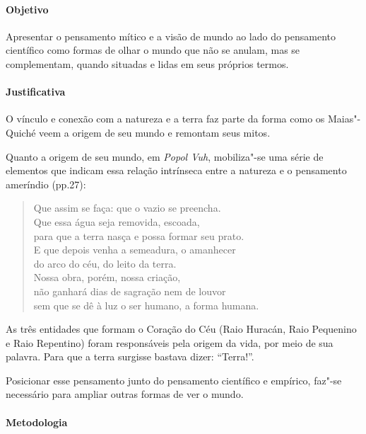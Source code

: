 \documentclass[11pt]{extarticle}
\begin{document}
\paragraph{Objetivo} Apresentar o pensamento mítico e a visão de mundo ao lado do pensamento científico
como formas de olhar o mundo que não se anulam, mas se complementam, quando situadas e 
lidas em seus próprios termos. 

\paragraph{Justificativa} O vínculo e conexão com a natureza e a terra faz parte da forma como 
os Maias"-Quiché veem a origem de seu mundo e remontam seus mitos. 

Quanto a origem de seu mundo, em \emph{Popol Vuh}, mobiliza"-se uma série de elementos que indicam essa 
relação intrínseca entre a natureza e o pensamento ameríndio (pp.27): 

\begin{verse}
Que assim se faça: que o vazio se preencha.\\
Que essa água seja removida, escoada,\\
para que a terra nasça e possa formar seu prato.\\
E que depois venha a semeadura, o amanhecer\\
do arco do céu, do leito da terra.\\
Nossa obra, porém, nossa criação,\\
não ganhará dias de sagração nem de louvor\\
sem que se dê à luz o ser humano, a forma humana.\\
\end{verse}

As três entidades que formam o Coração do Céu (Raio Huracán, Raio Pequenino e Raio Repentino) 
foram responsáveis pela origem da vida, por meio de sua palavra. 
Para que a terra surgisse bastava dizer: ``Terra!''.

Posicionar esse pensamento junto do pensamento científico e empírico, faz"-se necessário 
para ampliar outras formas de ver o mundo.


\paragraph{Metodologia} 
\end{document}
